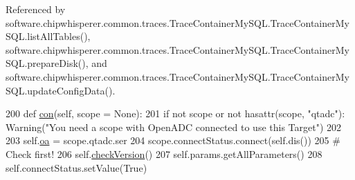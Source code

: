 Referenced by software.\+chipwhisperer.\+common.\+traces.\+Trace\+Container\+My\+S\+Q\+L.\+Trace\+Container\+My\+S\+Q\+L.\+list\+All\+Tables(), software.\+chipwhisperer.\+common.\+traces.\+Trace\+Container\+My\+S\+Q\+L.\+Trace\+Container\+My\+S\+Q\+L.\+prepare\+Disk(), and software.\+chipwhisperer.\+common.\+traces.\+Trace\+Container\+My\+S\+Q\+L.\+Trace\+Container\+My\+S\+Q\+L.\+update\+Config\+Data().


\begin{DoxyCode}
200     \textcolor{keyword}{def }\hyperlink{classsoftware_1_1chipwhisperer_1_1capture_1_1targets_1_1simpleserial__readers_1_1cw_1_1SimpleSerial__ChipWhisperer_ad230d88bb32486abb4ad420c77d27a34}{con}(self, scope = None):
201         \textcolor{keywordflow}{if} \textcolor{keywordflow}{not} scope \textcolor{keywordflow}{or} \textcolor{keywordflow}{not} hasattr(scope, \textcolor{stringliteral}{"qtadc"}): Warning(\textcolor{stringliteral}{"You need a scope with OpenADC connected to
       use this Target"})
202 
203         self.\hyperlink{classsoftware_1_1chipwhisperer_1_1capture_1_1targets_1_1simpleserial__readers_1_1cw_1_1SimpleSerial__ChipWhisperer_a0dcbd1e5567a535cd88ae4f774700ad4}{oa} = scope.qtadc.ser
204         scope.connectStatus.connect(self.dis())
205         \textcolor{comment}{# Check first!}
206         self.\hyperlink{classsoftware_1_1chipwhisperer_1_1capture_1_1targets_1_1simpleserial__readers_1_1cw_1_1SimpleSerial__ChipWhisperer_a05d346729c14a62df3f51e4d02ef6fdb}{checkVersion}()
207         self.params.getAllParameters()
208         self.connectStatus.setValue(\textcolor{keyword}{True})\end{DoxyCode}
\hypertarget{classsoftware_1_1chipwhisperer_1_1capture_1_1targets_1_1simpleserial__readers_1_1cw_1_1SimpleSerial__ChipWhisperer_ac7b713359837bff8bec89a725dfb719d}{}

